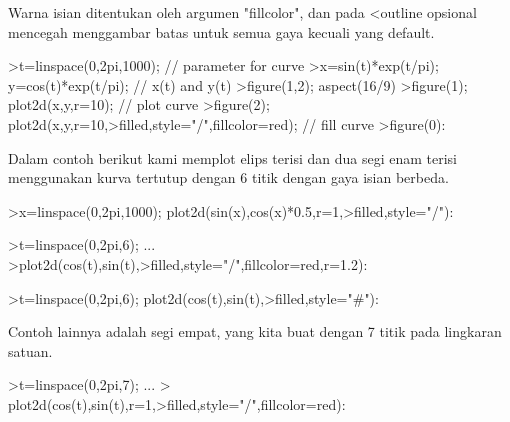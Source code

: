 \documentclass{article}
\begin{document}
\begin{eulernotebook}
\begin{eulercomment}
\begin{eulercomment}
\begin{eulercomment}
\begin{eulercomment}
\begin{eulercomment}
\begin{eulercomment}
\begin{eulercomment}
\begin{eulercomment}
\begin{eulercomment}
\begin{eulercomment}
\begin{eulercomment}
\begin{eulercomment}
\begin{eulercomment}
\begin{eulercomment}
\begin{eulercomment}
\begin{eulercomment}
\begin{eulercomment}
\begin{eulercomment}
\begin{eulercomment}
\begin{eulercomment}
\begin{eulercomment}
\begin{eulercomment}
\begin{eulercomment}
\begin{eulercomment}
\begin{eulercomment}
Warna isian ditentukan oleh argumen "fillcolor", dan pada \textless{}outline
opsional mencegah menggambar batas untuk semua gaya kecuali yang
default.
\end{eulercomment}
\begin{eulerprompt}
>t=linspace(0,2pi,1000); // parameter for curve
>x=sin(t)*exp(t/pi); y=cos(t)*exp(t/pi); // x(t) and y(t)
>figure(1,2); aspect(16/9)
>figure(1); plot2d(x,y,r=10); // plot curve
>figure(2); plot2d(x,y,r=10,>filled,style="/",fillcolor=red); // fill curve
>figure(0):
\end{eulerprompt}
\begin{eulercomment}
Dalam contoh berikut kami memplot elips terisi dan dua segi enam
terisi menggunakan kurva tertutup dengan 6 titik dengan gaya isian
berbeda.
\end{eulercomment}
\begin{eulerprompt}
>x=linspace(0,2pi,1000); plot2d(sin(x),cos(x)*0.5,r=1,>filled,style="/"):
\end{eulerprompt}
\begin{eulerprompt}
>t=linspace(0,2pi,6); ...
>plot2d(cos(t),sin(t),>filled,style="/",fillcolor=red,r=1.2):
\end{eulerprompt}
\begin{eulerprompt}
>t=linspace(0,2pi,6); plot2d(cos(t),sin(t),>filled,style="#"):
\end{eulerprompt}
\begin{eulercomment}
Contoh lainnya adalah segi empat, yang kita buat dengan 7 titik pada
lingkaran satuan.
\end{eulercomment}
\begin{eulerprompt}
>t=linspace(0,2pi,7);  ...
> plot2d(cos(t),sin(t),r=1,>filled,style="/",fillcolor=red):
\end{eulerprompt}
\begin{eulercomment}

\end{eulercomment}
\end{eulercomment}
\end{eulercomment}
\end{eulercomment}
\end{eulercomment}
\end{eulercomment}
\end{eulercomment}
\end{eulercomment}
\end{eulercomment}
\end{eulercomment}
\end{eulercomment}
\end{eulercomment}
\end{eulercomment}
\end{eulercomment}
\end{eulercomment}
\end{eulercomment}
\end{eulercomment}
\end{eulercomment}
\end{eulercomment}
\end{eulercomment}
\end{eulercomment}
\end{eulercomment}
\end{eulercomment}
\end{eulercomment}
\end{eulercomment}
\end{eulernotebook}
\end{document}
